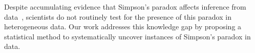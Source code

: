 
Despite accumulating evidence that Simpson's paradox affects inference from data~\cite{Xie2013population,estes1956problem}, scientists do not routinely test for the presence of this paradox in heterogeneous data. %
Our work addresses this knowledge gap by proposing a statistical method to systematically uncover instances of Simpson's paradox in data.






